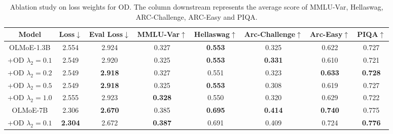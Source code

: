\begin{table}
\centering
\caption{Ablation study on loss weights for OD. The column downstream represents the average score of MMLU-Var, Hellaswag, ARC-Challenge, ARC-Easy and PIQA. }
\begin{tabular}{c|ccccccc}
\toprule
Model & Loss$\downarrow$ & Eval Loss$\downarrow$ & MMLU-Var$\uparrow$ & Hellaswag$\uparrow$ & Arc-Challenge$\uparrow$ & Arc-Easy$\uparrow$ & PIQA$\uparrow$ \\ \midrule
OLMoE-1.3B          & 2.554 & 2.924 & 0.327 & \textbf{0.553} & 0.325 & 0.622 & 0.727 \\
+OD $\lambda_2=0.1$ & 2.549 & 2.920 & 0.325 & \textbf{0.553} & \textbf{0.331} & 0.610 & 0.721 \\
+OD $\lambda_2=0.2$ & 2.549 & \textbf{2.918} & 0.327 & 0.551 & 0.323 & \textbf{0.633} & \textbf{0.728} \\
+OD $\lambda_2=0.5$ & 2.549 & \textbf{2.918} & 0.325 & \textbf{0.553} & 0.308 & 0.619 & 0.727 \\
+OD $\lambda_2=1.0$ & 2.555 & 2.923 & \textbf{0.328} & 0.550 & 0.320 & 0.629 & 0.722 \\
\midrule
OLMoE-7B            & 2.306 & \textbf{2.670} & 0.385 & \textbf{0.695} & \textbf{0.414} & \textbf{0.740} & 0.775  \\
+OD $\lambda_2=0.1$ & \textbf{2.304} & 2.672 & \textbf{0.387} & 0.691 & 0.409 & 0.724 & \textbf{0.776} \\
\bottomrule
\end{tabular}
\label{tab:ablation_od_weights}
\end{table}
